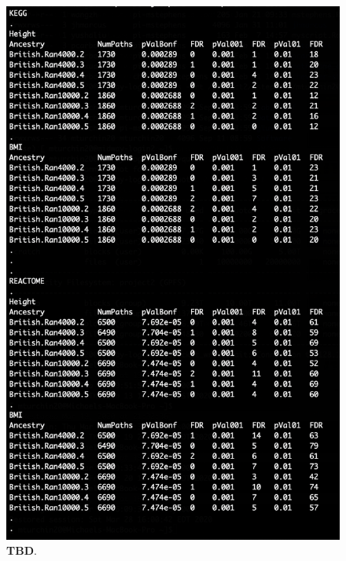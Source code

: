 \documentclass[12pt, a4paper]{article}
\begin{document}
\begin{figure}[htbp]
\centering
\includegraphics[scale=1.5]{Images/Supp/InterPath_Supp_Figure_FDRs_BritReps_vs1.png}
\caption[TBD]{\textbf{TBD}. }
\label{InterPath-Supp-Figure-BritReps-FDRs}
\end{figure}
\end{document}
